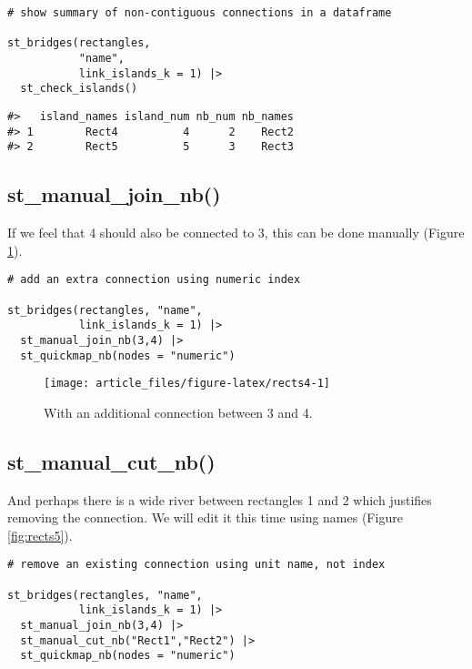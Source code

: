 \begin{verbatim}
# show summary of non-contiguous connections in a dataframe

st_bridges(rectangles, 
           "name", 
           link_islands_k = 1) |> 
  st_check_islands()
\end{verbatim}

\begin{verbatim}
#>   island_names island_num nb_num nb_names
#> 1        Rect4          4      2    Rect2
#> 2        Rect5          5      3    Rect3
\end{verbatim}

\hypertarget{st_manual_join_nb}{%
\subsection{st\_manual\_join\_nb()}\label{st_manual_join_nb}}

If we feel that 4 should also be connected to 3, this can be done
manually (Figure \ref{fig:rects4}).

\begin{verbatim}
# add an extra connection using numeric index

st_bridges(rectangles, "name", 
           link_islands_k = 1) |> 
  st_manual_join_nb(3,4) |> 
  st_quickmap_nb(nodes = "numeric")
\end{verbatim}

\begin{figure}

{\centering \texttt{[image: article\_files/figure-latex/rects4-1]} 

}

\caption{With an additional connection between 3 and 4. }\label{fig:rects4}
\end{figure}

\hypertarget{st_manual_cut_nb}{%
\subsection{st\_manual\_cut\_nb()}\label{st_manual_cut_nb}}

And perhaps there is a wide river between rectangles 1 and 2 which
justifies removing the connection. We will edit it this time using
names (Figure \ref{fig:rects5}).

\begin{verbatim}
# remove an existing connection using unit name, not index

st_bridges(rectangles, "name", 
           link_islands_k = 1) |> 
  st_manual_join_nb(3,4) |> 
  st_manual_cut_nb("Rect1","Rect2") |> 
  st_quickmap_nb(nodes = "numeric")
\end{verbatim}

